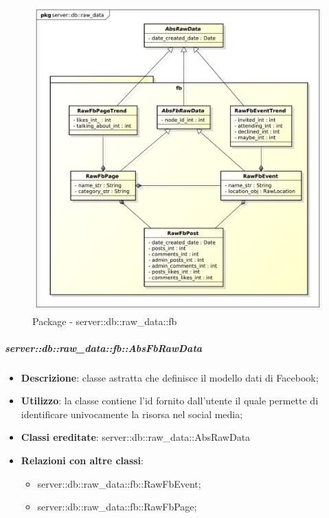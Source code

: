 

		\begin{figure}[htbp]
			\centering
			\centerline{\includegraphics[scale=0.5]{./images/server/raw_data_fb.pdf}}
			\caption{Package - server::db::raw\_data::fb}
		\end{figure}

		
		\subparagraph{server::db::raw\_data::fb::AbsFbRawData} %
		\label{subp:server_db_raw_data_fb_absfbrawdata}
			\begin{itemize}
				\item \textbf{Descrizione}: classe astratta che definisce il modello dati di Facebook;
				\item \textbf{Utilizzo}: la classe contiene l'id fornito dall'utente il quale permette di identificare univocamente la risorsa nel social media;
				\item \textbf{Classi ereditate}: server::db::raw\_data::AbsRawData
				\item \textbf{Relazioni con altre classi}:
					\begin{itemize}
						\item server::db::raw\_data::fb::RawFbEvent;
						\item server::db::raw\_data::fb::RawFbPage;
					\end{itemize}
			\end{itemize}


